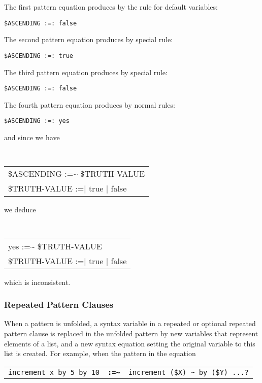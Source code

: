 \documentclass[12pt]{article}
\newcommand{\TT}[1]{{\tt \bfseries #1}}
\newcommand{\TILDE}{\textasciitilde}
\begin{document}
The first pattern equation produces by the rule for default variables:
\begin{center}
\tt \$ASCENDING :=: false \\
\end{center}

The second pattern equation produces by special rule:
\begin{center}
\tt \$ASCENDING :=: true \\
\end{center}

The third pattern equation produces by special rule:
\begin{center}
\tt \$ASCENDING :=: false \\
\end{center}

The fourth pattern equation produces by normal rules:
\begin{center}
\tt \$ASCENDING :=: yes \\
\end{center}
and since we have
\begin{center}
\tt
\begin{tabular}{l}
\$ASCENDING :=\TILDE{} \$TRUTH-VALUE \\
\$TRUTH-VALUE :=| true | false \\
\end{tabular}
\end{center}
we deduce
\begin{center}
\tt
\begin{tabular}{l}
yes :=\TILDE{} \$TRUTH-VALUE \\
\$TRUTH-VALUE :=| true | false \\
\end{tabular}
\end{center}

which is inconsistent.

\subsubsection{Repeated Pattern Clauses}
\label{REPEATED-PATTERN-CLAUSES}

When a pattern is unfolded, a syntax variable in a
repeated or optional repeated pattern clause is replaced
in the unfolded pattern by new variables that represent elements of a list,
and a new syntax equation setting the original variable to this list
is created.  For example, when the pattern in the equation

\begin{center}
\begin{tabular}{rcl}
\verb/increment x by 5 by 10/ & \TT{:=\TILDE}
			      & \verb/increment ($X) ~ by ($Y) ...?/ \\
\end{tabular}
\end{center}
\end{document}
